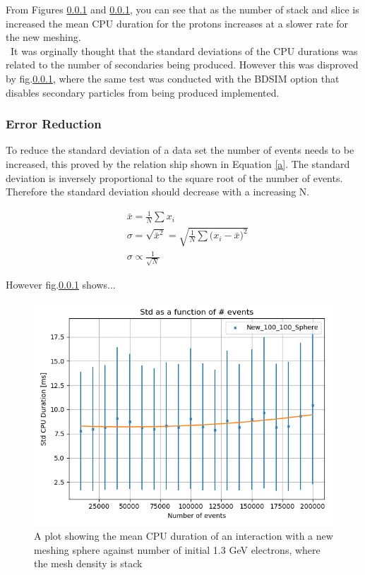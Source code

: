 \documentclass[12pt,a4paper]{article}
\begin{document}
\noindent From Figures \ref{} and \ref{}, you can see that as the number of stack and slice is increased the mean CPU duration for the protons increases at a slower rate for the new meshing. 
\\\
\noindent It was orginally thought that the standard deviations of the CPU durations was related to the number of secondaries being produced. However this was disproved by fig.\ref{}, where the same test was conducted with the BDSIM option that disables secondary particles from being produced implemented.

\subsubsection{Error Reduction}
To reduce the standard deviation of a data set the number of events needs to be increased, this proved by the relation ship shown in Equation \ref{a}.
The standard deviation is inversely proportional to the square root of the number of events. Therefore the standard deviation should decrease with a increasing N.

\begin{equation}
\begin{aligned}
& \bar{x} = \frac{1}{N}\sum{x_i}\\
& \sigma = \sqrt{\bar{x}^2} = \sqrt{\frac{1}{N}\sum{(x_i - \bar{x}})^2}\\
& \sigma \propto \frac{1}{\sqrt{N}} 
\end{aligned}
\label{a}
\end{equation}

However fig.\ref{} shows...\\
\begin{figure}[h!]
\centering
\includegraphics[scale=0.5]{Images//Error//std_N.png}
\caption[width=\columnwidth]{A plot showing the mean CPU duration of an interaction with a new meshing sphere against number of initial 1.3 GeV electrons, where the mesh density is stack }
\label{fcgvhjbkn}
\end{figure}
\end{document}
